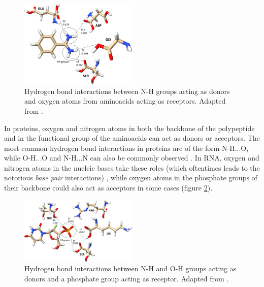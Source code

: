     \begin{figure}[H]
      \centering
      \includegraphics[width=0.5\textwidth]{figures/intro/hbonds.png}
      \caption{\label{fig:intro/hbonds} Hydrogen bond interactions between N-H groups acting as donors and oxygen atoms from aminoacids acting as receptors. Adapted from \cite{hbonds_2023}.}
    \end{figure}

    In proteins, oxygen and nitrogen atoms in both the backbone of the polypeptide and in the functional group of the aminoacids can act as donors or acceptors. The most common hydrogen bond interactions in proteins are of the form N-H...O, while O-H...O and N-H...N can also be commonly observed \cite{hbonds_2023}. In RNA, oxygen and nitrogen atoms in the nucleic bases take these roles (which oftentimes leads to the notorious \textit{base pair} interactions) \cite{rna_2015}, while oxygen atoms in the phosphate groups of their backbone could also act as acceptors in some cases \cite{hbonds_2023} (figure \ref{fig:intro/hbonds_po}).

    \begin{figure}[H]
      \centering
      \includegraphics[width=0.5\textwidth]{figures/intro/hbonds_po.png}
      \caption{\label{fig:intro/hbonds_po} Hydrogen bond interactions between N-H and O-H groups acting as donors and a phosphate group acting as receptor. Adapted from \cite{hbonds_2023}.}
    \end{figure}

